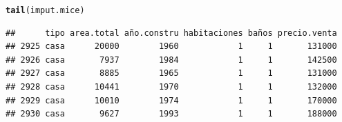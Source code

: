 \documentclass[9pt,letterpaper]{article}\usepackage[]{graphicx}\usepackage[]{color}
\makeatletter
\newcommand{\hlstd}[1]{\textcolor[rgb]{0.345,0.345,0.345}{#1}}%
\newcommand{\hlkwd}[1]{\textcolor[rgb]{0.737,0.353,0.396}{\textbf{#1}}}%
\newenvironment{kframe}{%
 \def\at@end@of@kframe{}%
 \ifinner\ifhmode%
  \def\at@end@of@kframe{\end{minipage}}%
  \begin{minipage}{\columnwidth}%
 \fi\fi%
 \def\FrameCommand##1{\hskip\@totalleftmargin \hskip-\fboxsep
 \colorbox{shadecolor}{##1}\hskip-\fboxsep
     \hskip-\linewidth \hskip-\@totalleftmargin \hskip\columnwidth}%
 \MakeFramed {\advance\hsize-\width
   \@totalleftmargin\z@ \linewidth\hsize
   \@setminipage}}%
 {\par\unskip\endMakeFramed%
 \at@end@of@kframe}
\newenvironment{knitrout}{}{} %
\makeatother
\begin{document}
\begin{enumerate}
\begin{enumerate}
\begin{knitrout}
\color{fgcolor}\begin{kframe}
\begin{alltt}
\hlkwd{tail}\hlstd{(imput.mice)}
\end{alltt}
\begin{verbatim}
##      tipo area.total año.constru habitaciones baños precio.venta
## 2925 casa      20000        1960            1     1       131000
## 2926 casa       7937        1984            1     1       142500
## 2927 casa       8885        1965            1     1       131000
## 2928 casa      10441        1970            1     1       132000
## 2929 casa      10010        1974            1     1       170000
## 2930 casa       9627        1993            1     1       188000
\end{verbatim}
\end{kframe}
\end{knitrout}
      

\end{enumerate}
\end{enumerate}
\end{document}
